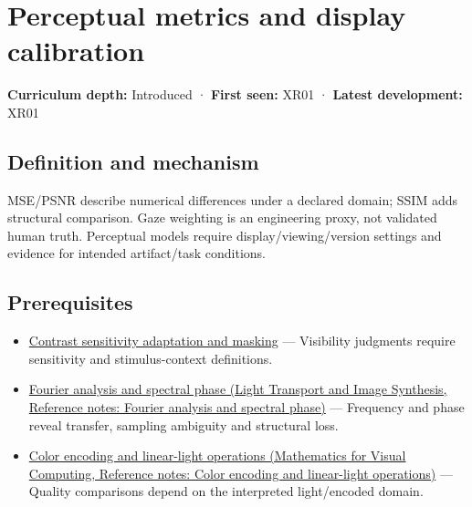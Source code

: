 \hypertarget{appendix-b2c1846508bf}{}\label{referencestart:appendix-b2c1846508bf}
\section{Perceptual metrics and display calibration}\label{appendix-b2c1846508bf-perceptual-metrics-and-display-calibration}

\hypertarget{appendix-b2c1846508bf-perceptual-metrics-and-display-calibration}{}

\textbf{Curriculum depth:} Introduced · \textbf{First seen:} XR01 · \textbf{Latest development:} XR01

\begin{allmightroledefinition}

\subsection{Definition and mechanism}\label{appendix-b2c1846508bf-definition-and-mechanism}

\hypertarget{appendix-b2c1846508bf-definition-and-mechanism}{}

MSE/PSNR describe numerical differences under a declared domain; SSIM adds structural comparison. Gaze weighting is an engineering proxy, not validated human truth. Perceptual models require display/viewing/version settings and evidence for intended artifact/task conditions.

\end{allmightroledefinition}

\subsection{Prerequisites}\label{appendix-b2c1846508bf-prerequisites}

\hypertarget{appendix-b2c1846508bf-prerequisites}{}

\begin{itemize}
\tightlist
\item
  \hyperref[appendix-b3aa9e8e01ad]{Contrast sensitivity adaptation and masking} --- Visibility judgments require sensitivity and stimulus-context definitions.
\item
  \href{../04-Light-Transport-and-Image-Synthesis/main.pdf\#nameddest=appendix-b60686ba06a1}{Fourier analysis and spectral phase (Light Transport and Image Synthesis, Reference notes: Fourier analysis and spectral phase)} --- Frequency and phase reveal transfer, sampling ambiguity and structural loss.
\item
  \href{../02-Mathematics-for-Visual-Computing/main.pdf\#nameddest=appendix-a9f83ad40792}{Color encoding and linear-light operations (Mathematics for Visual Computing, Reference notes: Color encoding and linear-light operations)} --- Quality comparisons depend on the interpreted light/encoded domain.
\end{itemize}

